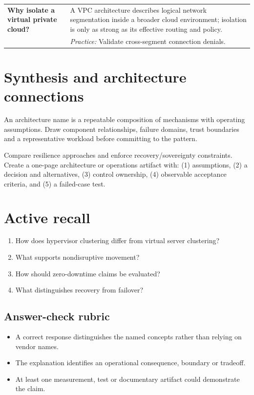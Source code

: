 \documentclass[10pt,letterpaper]{article}
\begin{document}
\begin{longtable}{>{\RaggedRight\arraybackslash}p{}>{\RaggedRight\arraybackslash}p{}}
\textbf{Why isolate a virtual private cloud?} & A VPC architecture describes logical network segmentation inside a broader cloud environment; isolation is only as strong as its effective routing and policy.\\[3pt]& \textcolor{petrol}{\emph{Practice:} Validate cross-segment connection denials.}\\[8pt]\midrule
\end{longtable}\normalsize
\section{Synthesis and architecture connections}
An architecture name is a repeatable composition of mechanisms with operating assumptions. Draw component relationships, failure domains, trust boundaries and a representative workload before committing to the pattern.
\begin{workbox}[title={Applied deliverable}]
Compare resilience approaches and enforce recovery/sovereignty constraints.\\[4pt]Create a one-page architecture or operations artifact with: (1) assumptions, (2) a decision and alternatives, (3) control ownership, (4) observable acceptance criteria, and (5) a failed-case test.
\end{workbox}
\section{Active recall}
\begin{enumerate}
\item How does hypervisor clustering differ from virtual server clustering?
\item What supports nondisruptive movement?
\item How should zero-downtime claims be evaluated?
\item What distinguishes recovery from failover?
\end{enumerate}
\subsection{Answer-check rubric}
\begin{itemize}
\item A correct response distinguishes the named concepts rather than relying on vendor names.
\item The explanation identifies an operational consequence, boundary or tradeoff.
\item At least one measurement, test or documentary artifact could demonstrate the claim.
\end{itemize}
\end{document}
